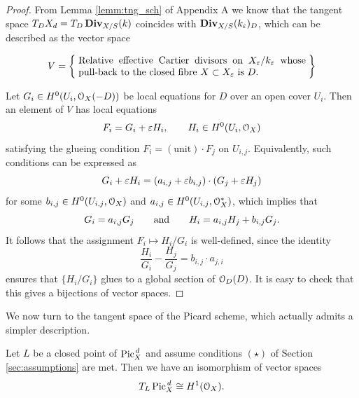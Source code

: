 	\begin{proof}
		From Lemma \ref{lemm:tng_sch} of Appendix A we know that the tangent space $T_D X_d = T_D\operatorname{\mathbf{Div}}_{X/S}(k)$ coincides with $ \operatorname{\mathbf{Div}}_{X/S}(k_\varepsilon)_D$, which can be described as the vector space
		
		$$ 
		V = \set{\parbox{8.2cm}{
		Relative effective Cartier divisors on $X_\eps / k_\eps$ 
		whose pull-back to the closed fibre $X\subset X_\eps$ is $D$.
		}}
		\vspace{0.5em}
		$$

		Let $G_i \in H^0(U_i,\mathcal{O}_X(-D)) $ be local equations for $D$ over an open cover $U_i$. Then an element of $V$ has local equations
		$$ F_i = G_i + \varepsilon H_i, \qquad H_i \in H^0(U_i,\mathcal{O}_X) $$
		satisfying the glueing condition $F_i = (\text{unit})\cdot F_j$ on $U_{i,j}$. Equivalently, such conditions can be expressed as
		$$ G_i + \varepsilon H_i = (a_{i,j} + \varepsilon b_{i,j})\cdot (G_j + \varepsilon H_j) $$
		for some $b_{i,j} \in H^0(U_{i,j},\mathcal{O}_X)$ and $ a_{i,j} \in H^0(U_{i,j},\mathcal{O}_X^*)$, which implies that
		$$ G_i = a_{i,j} G_j \qquad \text{and} \qquad H_i = a_{i,j} H_j + b_{i,j}G_j. $$
		It follows that the assignment $F_i \mapsto H_i/G_i$ is well-defined, since the identity
		$$ \frac{H_i}{G_i}-\frac{H_j}{G_j} = b_{i,j}\cdot a_{j,i} $$
		ensures that $\{H_i/G_i \} $ glues to a global section of $\mathcal{O}_D(D)$. It is easy to check that this gives a bijections of vector spaces.
	\end{proof}
	We now turn to the tangent space of the Picard scheme, which actually admits a simpler description.
	\begin{prop}\label{prop:tgn_pic}
		Let $L$ be a closed point of $ \operatorname{Pic}^{\,d}_X$ and assume conditions $(\star)$ of Section \ref{sec:assumptions} are met. Then we have an isomorphism of vector spaces
		$$ T_L \operatorname{Pic}^{\,d}_X \cong H^1(\mathcal{O}_X). $$
	\end{prop}
